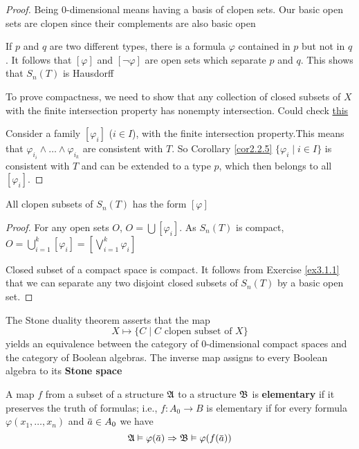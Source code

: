 \documentclass[11pt]{article}
\begin{document}
\begin{proof}
Being 0-dimensional means having a basis of clopen sets. Our basic open sets
are clopen since their complements are also basic open

If \(p\) and \(q\) are two different types, there is a formula \(\varphi\) contained in
\(p\) but not in \(q\). It follows that \([\varphi]\) and \([\neg\varphi]\) are
open sets which separate \(p\) and \(q\). This shows that \(S_n(T)\) is
Hausdorff

To prove compactness, we need to show that any collection of closed subsets
of \(X\) with the finite intersection property has nonempty intersection.
Could check  \href{http://www.msc.uky.edu/droyster/courses/fall99/math4181/classnotes/notes5.pdf}{this}

Consider a family \([\varphi_i]\) (\(i\in I\)), with the finite intersection property.This
means that \(\varphi_{i_i}\wedge\dots\wedge\varphi_{i_k}\) are consistent
with \(T\). So Corollary \ref{cor2.2.5} \(\{\varphi_i\mid i\in I\}\) is
consistent with \(T\) and can be extended to a type \(p\), which then belongs
to all \([\varphi_i]\).  
\end{proof}

\begin{lemma}[]
\label{lemma4.2.3}
All clopen subsets of \(S_n(T)\) has the form \([\varphi]\)
\end{lemma}

\begin{proof}
For any open sets \(O\), \(O=\bigcup[\varphi_i]\). As \(S_n(T)\) is compact, \(O=\bigcup_{i=1}^k[\varphi_i]=[\bigvee_{i=1}^k\varphi_i]\)

Closed subset of a compact space is compact. It follows from Exercise \ref{ex3.1.1} that we can
separate any two disjoint
closed subsets of \(S_n(T)\) by a basic open set.
\end{proof}

The Stone duality theorem asserts that the map
\begin{equation*}
X\mapsto\{C\mid C\text{ clopen subset of }X\}
\end{equation*}
yields an equivalence between the category of 0-dimensional compact spaces
and the category of Boolean algebras. The inverse map assigns to every
Boolean algebra to its \textbf{Stone space}

\begin{definition}[]


A map \(f\) from a subset of a structure \(\mathfrak{A}\) to a structure \(\mathfrak{B}\) is
\textbf{elementary} if it preserves the truth of formulas; i.e., \(f:A_0\to B\) is
elementary if for every formula \(\varphi(x_1,\dots,x_n)\) and \(\bbar{a}\in A_0\)
we have
\begin{equation*}
\fA\vDash\varphi(\bbar{a})\Rightarrow\fB\vDash\varphi(f(\bbar{a}))
\end{equation*}
\end{definition}
\end{document}
